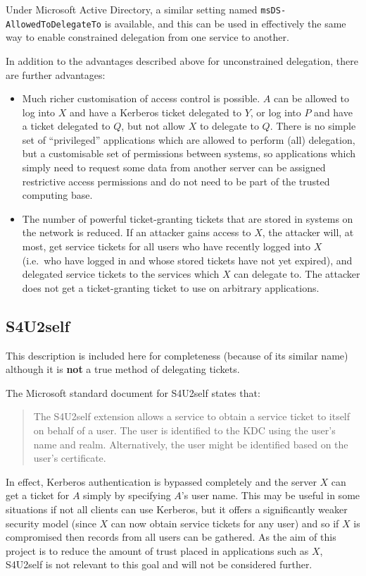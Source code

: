 \documentclass[12pt]{report}
\begin{document}
Under Microsoft Active Directory, a similar setting named \texttt{msDS-AllowedToDelegateTo} is available, and this can be used in effectively the same way to enable constrained delegation from one service to another\cite{MS-deleg-attribute}.

In addition to the advantages described above for unconstrained delegation, there are further advantages:

\begin{itemize}
\item
  Much richer customisation of access control is possible. $A$ can be allowed to log into $X$ and have a Kerberos ticket delegated to $Y$, or log into $P$ and have a ticket delegated to $Q$, but not allow $X$ to delegate to $Q$. There is no simple set of ``privileged'' applications which are allowed to perform (all) delegation, but a customisable set of permissions between systems, so applications which simply need to request some data from another server can be assigned restrictive access permissions and do not need to be part of the trusted computing base.
\item
  The number of powerful ticket-granting tickets that are stored in systems on the network is reduced. If an attacker gains access to $X$, the attacker will, at most, get service tickets for all users who have recently logged into $X$ (i.e.\ who have logged in and whose stored tickets have not yet expired), and delegated service tickets to the services which $X$ can delegate to. The attacker does not get a ticket-granting ticket to use on arbitrary applications.
\end{itemize}

\subsection{S4U2self}
This description is included here for completeness (because of its similar name) although it is \textbf{not} a true method of delegating tickets.

The Microsoft standard document for S4U2self\cite{MS-s4u2} states that:

\begin{quote}
  The S4U2self extension allows a service to obtain a service ticket to itself on behalf of a user. The user is identified to the KDC using the user's name and realm. Alternatively, the user might be identified based on the user's certificate.
\end{quote}

In effect, Kerberos authentication is bypassed completely and the server $X$ can get a ticket for $A$ simply by specifying $A$'s user name. This may be useful in some situations if not all clients can use Kerberos, but it offers a significantly weaker security model (since $X$ can now obtain service tickets for any user) and so if $X$ is compromised then records from all users can be gathered. As the aim of this project is to reduce the amount of trust placed in applications such as $X$, S4U2self is not relevant to this goal and will not be considered further.
\end{document}

